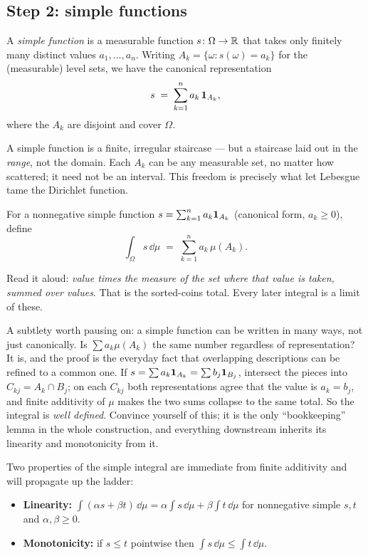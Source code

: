 \subsection{Step 2: simple functions}

\begin{definition}
\label{ch37:def-simple}
A \emph{simple function} is a measurable function $s\colon\Omega\to\mathbb{R}$ that takes
only finitely many distinct values $a_1,\dots,a_n$. Writing
$A_k=\{\omega: s(\omega)=a_k\}$ for the (measurable) level sets, we have the
canonical representation
\[
  s \;=\; \sum_{k=1}^n a_k\,\mathbf{1}_{A_k},
\]
where the $A_k$ are disjoint and cover $\Omega$.
\end{definition}

A simple function is a finite, irregular staircase --- but a staircase laid out
in the \emph{range}, not the domain. Each $A_k$ can be any measurable set, no
matter how scattered; it need not be an interval. This freedom is precisely what
let Lebesgue tame the Dirichlet function.

\begin{definition}
\label{ch37:def-int-simple}
For a nonnegative simple function $s=\sum_{k=1}^n a_k \mathbf{1}_{A_k}$ (canonical
form, $a_k\ge 0$), define
\[
  \int_\Omega s \,\dd\mu \;=\; \sum_{k=1}^n a_k\,\mu(A_k).
\]
\end{definition}

Read it aloud: \emph{value times the measure of the set where that value is
taken, summed over values}. That is the sorted-coins total. Every later integral
is a limit of these.

\begin{walkbox}
A subtlety worth pausing on: a simple function can be written in many ways, not
just canonically. Is $\sum a_k\mu(A_k)$ the same number regardless of
representation? It is, and the proof is the everyday fact that overlapping
descriptions can be refined to a common one. If $s=\sum a_k\mathbf{1}_{A_k}=\sum
b_j\mathbf{1}_{B_j}$, intersect the pieces into $C_{kj}=A_k\cap B_j$; on each
$C_{kj}$ both representations agree that the value is $a_k=b_j$, and finite
additivity of $\mu$ makes the two sums collapse to the same total. So the
integral is \emph{well defined}. Convince yourself of this; it is the only
``bookkeeping'' lemma in the whole construction, and everything downstream
inherits its linearity and monotonicity from it.
\end{walkbox}

Two properties of the simple integral are immediate from finite additivity and
will propagate up the ladder:
\begin{itemize}
\item \textbf{Linearity:} $\int (\alpha s + \beta t)\,\dd\mu = \alpha\int
  s\,\dd\mu + \beta\int t\,\dd\mu$ for nonnegative simple $s,t$ and
  $\alpha,\beta\ge 0$.
\item \textbf{Monotonicity:} if $s\le t$ pointwise then $\int s\,\dd\mu \le \int
  t\,\dd\mu$.
\end{itemize}

